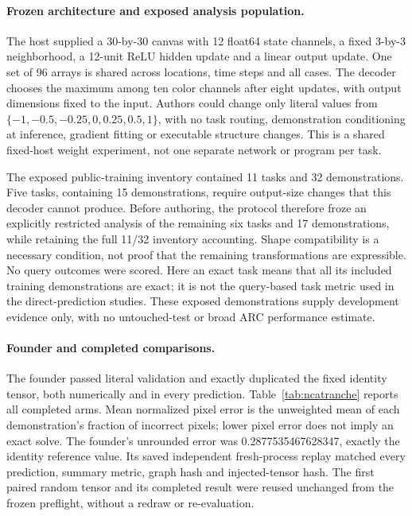 \documentclass[11pt]{article}
\begin{document}
\paragraph{Frozen architecture and exposed analysis population.}
The host supplied a 30-by-30 canvas with 12 float64 state channels, a fixed
3-by-3 neighborhood, a 12-unit ReLU hidden update and a linear output update.
One set of 96 arrays is shared across locations, time steps and all cases.
The decoder chooses the maximum among ten color channels after eight updates,
with output dimensions fixed to the input. Authors could change only literal
values from $\{-1,-0.5,-0.25,0,0.25,0.5,1\}$, with no task routing,
demonstration conditioning at inference, gradient fitting or executable
structure changes. This is a shared fixed-host weight experiment, not one
separate network or program per task.

The exposed public-training inventory contained 11 tasks and 32 demonstrations.
Five tasks, containing 15 demonstrations, require output-size changes that this
decoder cannot produce. Before authoring, the protocol therefore froze an
explicitly restricted analysis of the remaining six tasks and 17 demonstrations,
while retaining the full 11/32 inventory accounting. Shape compatibility is a
necessary condition, not proof that the remaining transformations are expressible.
No query outcomes were scored. Here an exact task means that all its included
training demonstrations are exact; it is not the query-based task metric used
in the direct-prediction studies. These exposed demonstrations supply development
evidence only, with no untouched-test or broad ARC performance estimate.

\paragraph{Founder and completed comparisons.}
The founder passed literal validation and exactly duplicated the fixed identity
tensor, both numerically and in every prediction. Table~\ref{tab:ncatranche}
reports all completed arms. Mean normalized pixel error is the unweighted mean
of each demonstration's fraction of incorrect pixels; lower pixel error does
not imply an exact solve. The founder's unrounded error was
0.2877535467628347, exactly the identity reference value. Its saved independent
fresh-process replay matched every prediction, summary metric, graph hash and
injected-tensor hash. The first paired random tensor and its completed result
were reused unchanged from the frozen preflight, without a redraw or re-evaluation.
\end{document}
